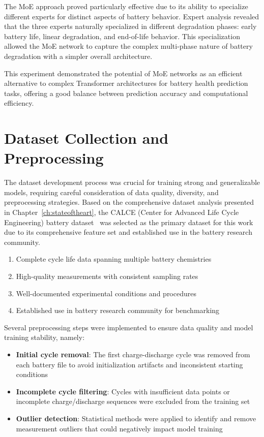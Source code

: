 The MoE approach proved particularly effective due to its ability to specialize different experts for distinct aspects of battery behavior. Expert analysis revealed that the three experts naturally specialized in different degradation phases: early battery life, linear degradation, and end-of-life behavior. This specialization allowed the MoE network to capture the complex multi-phase nature of battery degradation with a simpler overall architecture.

This experiment demonstrated the potential of MoE networks as an efficient alternative to complex Transformer architectures for battery health prediction tasks, offering a good balance between prediction accuracy and computational efficiency.

\section{Dataset Collection and Preprocessing}
\label{sec:dataset_preprocessing}

The dataset development process was crucial for training strong and generalizable models, requiring careful consideration of data quality, diversity, and preprocessing strategies. Based on the comprehensive dataset analysis presented in Chapter~\ref{ch:stateoftheart}, the CALCE (Center for Advanced Life Cycle Engineering) battery dataset~\cite{CALCE_battery_nodate} was selected as the primary dataset for this work due to its comprehensive feature set and established use in the battery research community.

\begin{enumerate}
    \item Complete cycle life data spanning multiple battery chemistries
    \item High-quality measurements with consistent sampling rates
    \item Well-documented experimental conditions and procedures
    \item Established use in battery research community for benchmarking
\end{enumerate}


Several preprocessing steps were implemented to ensure data quality and model training stability, namely:

\begin{itemize}
    \item \textbf{Initial cycle removal}: The first charge-discharge cycle was removed from each battery file to avoid initialization artifacts and inconsistent starting conditions
    \item \textbf{Incomplete cycle filtering}: Cycles with insufficient data points or incomplete charge/discharge sequences were excluded from the training set
    \item \textbf{Outlier detection}: Statistical methods were applied to identify and remove measurement outliers that could negatively impact model training
\end{itemize}

